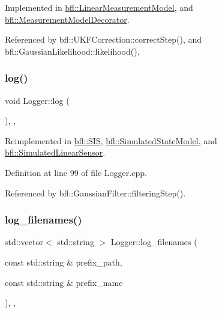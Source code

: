 Implemented in \mbox{\hyperlink{classbfl_1_1LinearMeasurementModel_a12485b4b6d511e97e338a4db6861b277}{bfl\+::\+Linear\+Measurement\+Model}}, and \mbox{\hyperlink{classbfl_1_1MeasurementModelDecorator_af2c4f2057a721f77d02fc54498136d47}{bfl\+::\+Measurement\+Model\+Decorator}}.



Referenced by bfl\+::\+U\+K\+F\+Correction\+::correct\+Step(), and bfl\+::\+Gaussian\+Likelihood\+::likelihood().

\mbox{\label{classbfl_1_1Logger_ad44f46593cb8c4c87c1178eb326e2f64}} 
\subsubsection{\texorpdfstring{log()}{log()}}
{\footnotesize\ttfamily void Logger\+::log (\begin{DoxyParamCaption}{ }\end{DoxyParamCaption})\hspace{0.3cm}{\ttfamily [protected]}, {\ttfamily [virtual]}, {\ttfamily [inherited]}}



Reimplemented in \mbox{\hyperlink{classbfl_1_1SIS_aeb0b87af1cc1fc4b616989ef489ecccc}{bfl\+::\+S\+IS}}, \mbox{\hyperlink{classbfl_1_1SimulatedStateModel_aa022eb0d50d898ffcc831af2907265b2}{bfl\+::\+Simulated\+State\+Model}}, and \mbox{\hyperlink{classbfl_1_1SimulatedLinearSensor_ab75bbe744d8516c97dfc90ad499b10e6}{bfl\+::\+Simulated\+Linear\+Sensor}}.



Definition at line 99 of file Logger.\+cpp.



Referenced by bfl\+::\+Gaussian\+Filter\+::filtering\+Step().

\mbox{\label{classbfl_1_1Logger_a328ceaa8e70e6918f11142b12b8be217}} 
\subsubsection{\texorpdfstring{log\+\_\+filenames()}{log\_filenames()}}
{\footnotesize\ttfamily std\+::vector$<$ std\+::string $>$ Logger\+::log\+\_\+filenames (\begin{DoxyParamCaption}\item[{const std\+::string \&}]{prefix\+\_\+path,  }\item[{const std\+::string \&}]{prefix\+\_\+name }\end{DoxyParamCaption})\hspace{0.3cm}{\ttfamily [protected]}, {\ttfamily [virtual]}, {\ttfamily [inherited]}}




